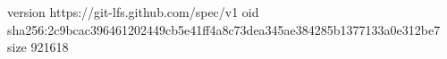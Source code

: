 version https://git-lfs.github.com/spec/v1
oid sha256:2c9bcac396461202449cb5e41ff4a8c73dea345ae384285b1377133a0e312be7
size 921618
